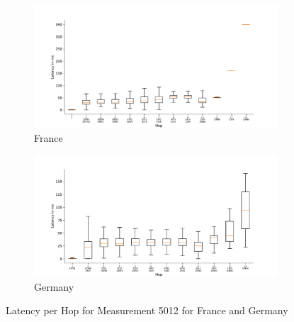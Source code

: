 \begin{figure}
	\centering
	\begin{subfigure}[b]{\linewidth}
		\includegraphics[width=\linewidth]{chapters/4-results/traceroute/img/latency-per-hop-FR-5012.pdf}
		\caption{France}
	\end{subfigure}
	\begin{subfigure}[b]{\linewidth}
		\includegraphics[width=\linewidth]{chapters/4-results/traceroute/img/latency-per-hop-DE-5012.pdf}
		\caption{Germany}
	\end{subfigure}
	\caption{Latency per Hop for Measurement 5012 for France and Germany}
	\label{fig:latency-change-per-hop-appendix-12}
\end{figure}

